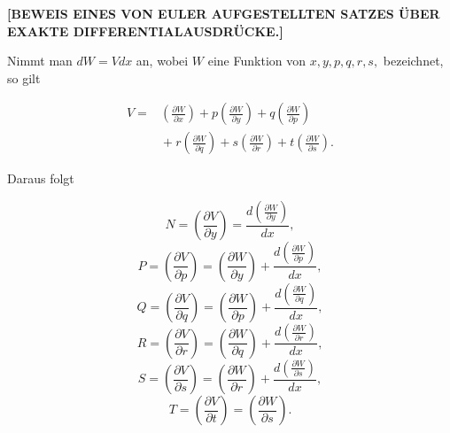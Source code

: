\begin{center}\textbf{[BEWEIS EINES VON EULER AUFGESTELLTEN SATZES ÜBER EXAKTE DIFFERENTIALAUSDRÜCKE.]}\end{center}



\noindent\hspace*{\parindent}Nimmt man $dW = Vdx$ an, wobei $W$ eine Funktion von $x, y, p, q, r, s,$ bezeichnet, so gilt

\[
\begin{aligned}V ={}&\left(\frac{\partial W}{\partial x}\right) + p\left(\frac{\partial W}{\partial y}\right) + q\left(\frac{\partial W}{\partial p}\right) \\ &{}+ r\left(\frac{\partial W}{\partial q}\right) + s\left(\frac{\partial W}{\partial r}\right) + t\left(\frac{\partial W}{\partial s}\right).
\end{aligned}
\]

\par\noindent Daraus folgt

\[
N = \left(\frac{\partial V}{\partial y}\right) = \frac{d\left(\frac{\partial W}{\partial y}\right)}{dx},
\]
\[
P = \left(\frac{\partial V}{\partial p}\right) = \left(\frac{\partial W}{\partial y}\right) + \frac{d\left(\frac{\partial W}{\partial p}\right)}{dx},
\]
\[
Q = \left(\frac{\partial V}{\partial q}\right) = \left(\frac{\partial W}{\partial p}\right) + \frac{d\left(\frac{\partial W}{\partial q}\right)}{dx},
\]
\[
R = \left(\frac{\partial V}{\partial r}\right) = \left(\frac{\partial W}{\partial q}\right) + \frac{d\left(\frac{\partial W}{\partial r}\right)}{dx},
\]
\[
S = \left(\frac{\partial V}{\partial s}\right) = \left(\frac{\partial W}{\partial r}\right) + \frac{d\left(\frac{\partial W}{\partial s}\right)}{dx},
\]
\[
T = \left(\frac{\partial V}{\partial t}\right) = \left(\frac{\partial W}{\partial s}\right).
\]

